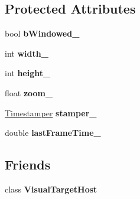 \subsection*{Protected Attributes}
\begin{DoxyCompactItemize}
\item 
\hypertarget{class_picto_1_1_visual_target_a07228f221970a67ea5727de7ca58382a}{bool {\bfseries b\-Windowed\-\_\-}}\label{class_picto_1_1_visual_target_a07228f221970a67ea5727de7ca58382a}

\item 
\hypertarget{class_picto_1_1_visual_target_a5d2589443ca5096ef8b8ded54d943a2f}{int {\bfseries width\-\_\-}}\label{class_picto_1_1_visual_target_a5d2589443ca5096ef8b8ded54d943a2f}

\item 
\hypertarget{class_picto_1_1_visual_target_aee2daee767b23525e22247fb906f96c6}{int {\bfseries height\-\_\-}}\label{class_picto_1_1_visual_target_aee2daee767b23525e22247fb906f96c6}

\item 
\hypertarget{class_picto_1_1_visual_target_ad9ffb956b7c73275b14fb7247e580663}{float {\bfseries zoom\-\_\-}}\label{class_picto_1_1_visual_target_ad9ffb956b7c73275b14fb7247e580663}

\item 
\hypertarget{class_picto_1_1_visual_target_ae2580245790a3a33bc9e3be2539436ae}{\hyperlink{class_picto_1_1_timestamper}{Timestamper} {\bfseries stamper\-\_\-}}\label{class_picto_1_1_visual_target_ae2580245790a3a33bc9e3be2539436ae}

\item 
\hypertarget{class_picto_1_1_visual_target_adb893ba4f422bf39e36410f1ae7864e0}{double {\bfseries last\-Frame\-Time\-\_\-}}\label{class_picto_1_1_visual_target_adb893ba4f422bf39e36410f1ae7864e0}

\end{DoxyCompactItemize}
\subsection*{Friends}
\begin{DoxyCompactItemize}
\item 
\hypertarget{class_picto_1_1_visual_target_a8f365d94a47350048f58fa7a674b5f47}{class {\bfseries Visual\-Target\-Host}}\label{class_picto_1_1_visual_target_a8f365d94a47350048f58fa7a674b5f47}

\end{DoxyCompactItemize}


